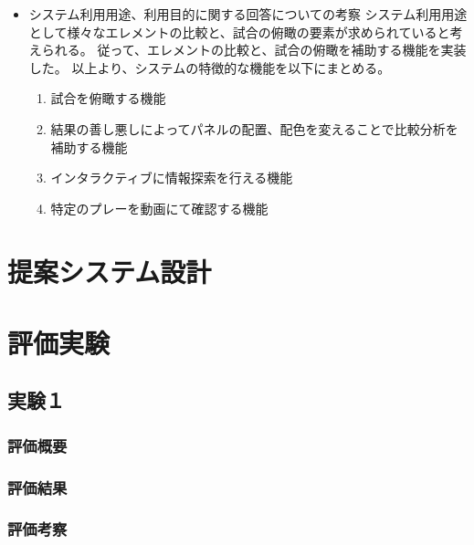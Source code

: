 \documentclass[sotsuron]{kuee}
\begin{document}
\begin{itemize}
	\item システム利用用途、利用目的に関する回答についての考察
		システム利用用途として様々なエレメントの比較と、試合の俯瞰の要素が求められていると考えられる。
		従って、エレメントの比較と、試合の俯瞰を補助する機能を実装した。
		以上より、システムの特徴的な機能を以下にまとめる。
		\begin{enumerate}	
			\item 試合を俯瞰する機能
			\item 結果の善し悪しによってパネルの配置、配色を変えることで比較分析を補助する機能
			\item インタラクティブに情報探索を行える機能
			\item 特定のプレーを動画にて確認する機能
		\end{enumerate}
\end{itemize}

\chapter{提案システム設計}

\chapter{評価実験}
\section{実験１}
\subsection{評価概要}
\subsection{評価結果}
\subsection{評価考察}
\end{document}
